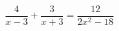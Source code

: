 \begin{ex}[type=equation]
	\begin{condition}
		$\dfrac{4}{x - 3} + \dfrac{3}{x + 3} = \dfrac{12}{2x^2 - 18}$
	\end{condition}
\end{ex}